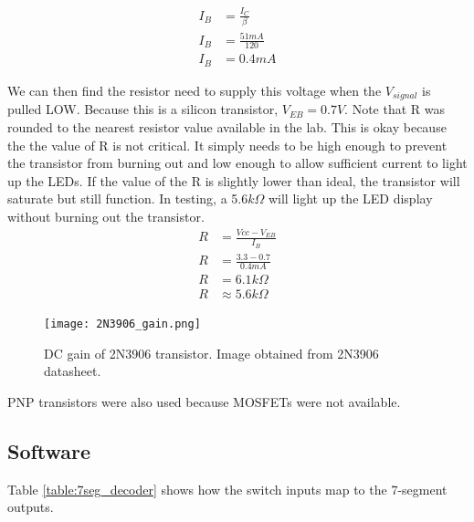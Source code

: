 \documentclass[11pt]{article}
\begin{document}
\begin{align*}
I_{B} &= \frac{I_{C}}{\beta} \\
I_{B} &= \frac{51mA}{120} \\
I_{B} &= 0.4mA
\end{align*}

We can then find the resistor need to supply this voltage when the $V_{signal}$ is pulled LOW. Because this is a silicon transistor, $V_{EB}=0.7V$.  Note that R was rounded to the nearest resistor value available in the lab. This is okay because the the value of R is not critical. It simply needs to be high enough to prevent the transistor from burning out and low enough to allow sufficient current to light up the LEDs. If the value of the R is slightly lower than ideal, the transistor will saturate but still function. In testing, a 5.6$k\Omega$ will light up the LED display without burning out the transistor. \\

\begin{align*}
R &= \frac{Vcc-V_{EB}}{I_{B}} \\
R &= \frac{3.3-0.7}{0.4mA} \\
R &= 6.1k\Omega	\\
R &\approx 5.6k\Omega
\end{align*}



\begin{figure}[h!]
\centering
\texttt{[image: 2N3906\_gain.png]}
\caption{DC gain of 2N3906 transistor. Image obtained from 2N3906 datasheet.}
\label{fig:2N3906_gain}
\end{figure} 


PNP transistors were also used because MOSFETs were not available. 

\subsection{Software}

Table \ref{table:7seg_decoder} shows how the switch inputs map to the 7-segment outputs. \\
\end{document}

